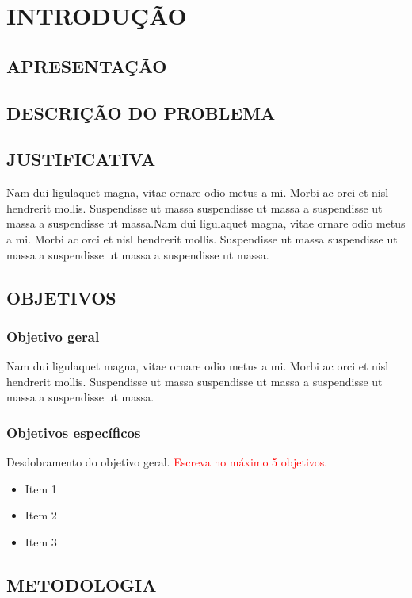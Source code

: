 \chapter{INTRODUÇÃO} %
\lipsum[1-1]

\section{APRESENTAÇÃO}
\lipsum[1-1]

\section{DESCRIÇÃO DO PROBLEMA}
\lipsum[1-1]

\section{JUSTIFICATIVA}
Nam dui ligulaquet magna, vitae ornare odio metus a mi. Morbi ac orci et nisl hendrerit mollis. Suspendisse ut massa suspendisse ut massa a suspendisse ut massa a suspendisse ut massa.Nam dui ligulaquet magna, vitae ornare odio metus a mi. Morbi ac orci et nisl hendrerit mollis. Suspendisse ut massa suspendisse ut massa a suspendisse ut massa a suspendisse ut massa.

\section{OBJETIVOS}

\subsection{Objetivo geral}
Nam dui ligulaquet magna, vitae ornare odio metus a mi. Morbi ac orci et nisl hendrerit mollis. Suspendisse ut massa suspendisse ut massa a suspendisse ut massa a suspendisse ut massa.

\subsection{Objetivos específicos}
Desdobramento do objetivo geral. \textcolor{red}{Escreva no máximo 5 objetivos.}
 \begin{itemize}
	\item Item 1
	\item Item 2
	\item Item 3
\end{itemize}

 \section{METODOLOGIA}
 \lipsum[1-1]